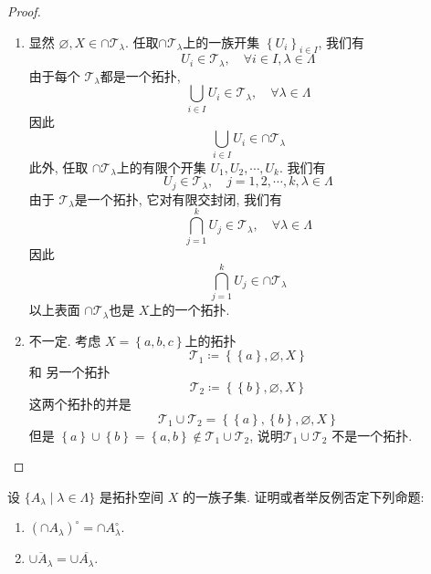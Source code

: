 \documentclass[../main.tex]{subfiles}
\begin{document}
\begin{proof}
    \begin{enumerate}
        \item 显然 \(  \varnothing, X \in \cap \mathcal{T}_{ \lambda }  \). 任取\(  \cap \mathcal{T}_{ \lambda }  \)上的一族开集 \(  \left\{ U_{i} \right\}_{i \in I}  \),  我们有  \[
        U_{i}\in \mathcal{T}_{ \lambda },\quad \forall i \in I,  \lambda \in  \Lambda 
        \] 由于每个 \(  \mathcal{T}_{ \lambda }  \)都是一个拓扑,  \[
        \bigcup _{i \in I}U_{i} \in \mathcal{T}_{ \lambda },\quad \forall  \lambda \in  \Lambda 
        \]因此 \[
        \bigcup _{i \in I}U_{i} \in  \cap \mathcal{T}_{ \lambda }
        \] 此外, 任取 \( \cap  \mathcal{T}_{ \lambda }  \)上的有限个开集 \(  U_1,U_2,\cdots ,U_{k}  \).   我们有 \[
        U_{j}\in \mathcal{T}_{ \lambda }, \quad j= 1,2,\cdots ,k,  \lambda \in  \Lambda 
        \]由于 \(  \mathcal{T}_{ \lambda }  \)是一个拓扑, 它对有限交封闭, 我们有 \[
        \bigcap _{j= 1}^{k}U_{j} \in \mathcal{T}_{ \lambda },\quad \forall  \lambda \in  \Lambda 
        \] 因此 \[
        \bigcap _{j = 1}^{k}U_{j} \in \cap \mathcal{T}_{ \lambda }
        \]以上表面 \(  \cap \mathcal{T}_{ \lambda }  \)也是 \(  X  \)上的一个拓扑.  
        \item 不一定. 考虑 \(  X= \left\{ a,b,c \right\}  \)上的拓扑 \[
     \mathcal{T}_{1}\coloneqq   \left\{ \left\{ a \right\}, \varnothing,X \right\}
        \]和 另一个拓扑 \[
    \mathcal{T}_{2}\coloneqq     \left\{ \left\{ b \right\},\varnothing,X \right\}
        \]这两个拓扑的并是 \[
       \mathcal{T}_{1}\cup \mathcal{T}_{2}=  \left\{ \left\{ a \right\},\left\{ b \right\}, \varnothing,X \right\}
        \]但是 \( \left\{ a \right\}\cup \left\{ b \right\}=  \left\{ a,b \right\} \not \in \mathcal{T}_{1}\cup \mathcal{T}_{2}  \), 说明\(  \mathcal{T}_{1}\cup \mathcal{T}_{2}   \) 不是一个拓扑.  
    \end{enumerate}
    
\end{proof}
\begin{exercise}{}{}
设 $\{A_\lambda \mid \lambda \in \Lambda\}$ 是拓扑空间 $X$ 的一族子集. 证明或者举反例否定下列命题:
\begin{enumerate}
\item $(\cap A_\lambda)^{\circ} = \cap A_\lambda^{\circ}$.
\item $\overline{\cup A_\lambda} = \cup \overline{A_\lambda}$.
\end{enumerate}
\end{exercise}
\end{document}
